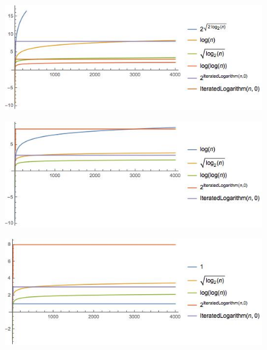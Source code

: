 \documentclass[11 pt, a4paper]{article}
\theoremstyle{definition}
\begin{document}
\begin{enumerate}
\begin{figure}[H]
      \end{figure} \begin{figure}[H]
         \centering
          \includegraphics[trim=0cm 0cm 0cm 0cm, width=15cm]{todas2.jpg} 
      \end{figure} \begin{figure}[H]
         \centering
          \includegraphics[trim=0cm 0cm 0cm 0cm, width=15cm]{todas3.jpg} 
      \end{figure} \begin{figure}[H]
         \centering
          \includegraphics[trim=0cm 0cm 0cm 0cm, width=15cm]{todas4.jpg} 
      \end{figure}

\end{enumerate}
\end{document}
